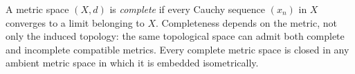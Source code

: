 
A metric space $(X,d)$ is \emph{complete} if every Cauchy sequence $(x_n)$ in $X$ converges to a limit belonging to $X$. Completeness depends on the metric, not only the induced topology: the same topological space can admit both complete and incomplete compatible metrics. Every complete metric space is closed in any ambient metric space in which it is embedded isometrically.
